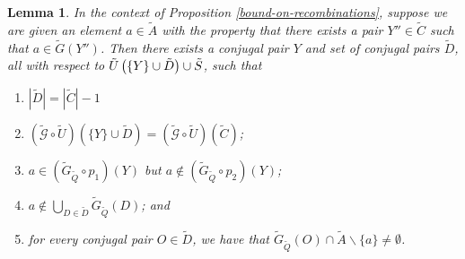 \documentclass[twocolumn,showpacs,preprintnumbers,amsmath,amssymb,nofootinbib,pra,floatfix]{revtex4-1}
\newtheorem{lemma}{Lemma}
\newcommand{\set}{\tilde}
\newcommand{\genfun}{\tilde{\mathcal{G}}}
\begin{document}
\begin{lemma}
\label{directed-gaussian-elimination-of-logicals}
In the context of Proposition \ref{bound-on-recombinations}, suppose we are given an element $a\in \set A$ with the property that there exists a pair $Y''\in\set C$ such that $a\in\set G(Y'')$. Then there exists a conjugal pair $Y$ and set of conjugal pairs $\set D$, all with respect to $\set U\paren{\{Y\}\cup \set D} \cup \set S$, such that
\begin{enumerate}
\item $|\set D| = |\set C|-1$
\item $(\genfun\circ\set U)(\{Y\}\cup \set D)=(\genfun\circ\set U)(\set C)$;
\item $a\in (\set G_{\set Q}\circ p_1)(Y)$ but $a\notin (\set G_{\set Q}\circ p_2)(Y)$;
\item $a\notin \bigcup_{D\in \set D} \set G_{\set Q}(D)$; and
\item for every conjugal pair $O\in\set D$, we have that $\set G_{\set Q}(O) \cap \set A\backslash \{a\} \ne \emptyset$.
\end{enumerate}
\end{lemma}
\end{document}
